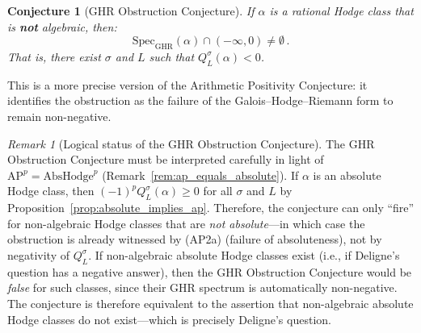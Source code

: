 \documentclass[aps,prd,twocolumn,superscriptaddress,nofootinbib]{revtex4-2}
\newtheorem{conjecture}[theorem]{Conjecture}
\theoremstyle{definition}
\theoremstyle{remark}
\newtheorem{remark}[theorem]{Remark}
\begin{document}
\begin{conjecture}[GHR Obstruction Conjecture]
\label{conj:ghr}
If $\alpha$ is a rational Hodge class that is \textbf{not} algebraic, then:
\begin{equation}
\mathrm{Spec}_{\mathrm{GHR}}(\alpha) \cap (-\infty, 0) \neq \emptyset\,.
\end{equation}
That is, there exist $\sigma$ and $L$ such that $Q_L^\sigma(\alpha) < 0$.
\end{conjecture}

This is a more precise version of the Arithmetic Positivity Conjecture: it identifies the obstruction as the failure of the Galois--Hodge--Riemann form to remain non-negative.

\begin{remark}[Logical status of the GHR Obstruction Conjecture]
\label{rem:ghr_status}
The GHR Obstruction Conjecture must be interpreted carefully in light of $\mathrm{AP}^p = \mathrm{AbsHodge}^p$ (Remark~\ref{rem:ap_equals_absolute}). If $\alpha$ is an absolute Hodge class, then $(-1)^p Q_L^\sigma(\alpha) \geq 0$ for all $\sigma$ and $L$ by Proposition~\ref{prop:absolute_implies_ap}. Therefore, the conjecture can only ``fire'' for non-algebraic Hodge classes that are \textit{not absolute}---in which case the obstruction is already witnessed by (AP2a) (failure of absoluteness), not by negativity of $Q_L^\sigma$. If non-algebraic absolute Hodge classes exist (i.e., if Deligne's question has a negative answer), then the GHR Obstruction Conjecture would be \textit{false} for such classes, since their GHR spectrum is automatically non-negative. The conjecture is therefore equivalent to the assertion that non-algebraic absolute Hodge classes do not exist---which is precisely Deligne's question.
\end{remark}
\end{document}
